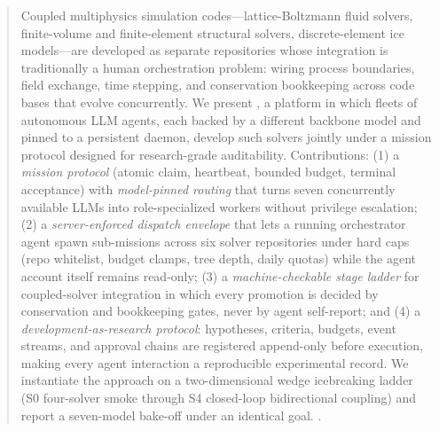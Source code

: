 \begin{abstract}
Coupled multiphysics simulation codes---lattice-Boltzmann fluid solvers,
finite-volume and finite-element structural solvers, discrete-element ice
models---are developed as separate repositories whose integration is
traditionally a human orchestration problem: wiring process boundaries,
field exchange, time stepping, and conservation bookkeeping across code
bases that evolve concurrently. We present \sysname{}, a platform in which
fleets of autonomous LLM agents, each backed by a different backbone model
and pinned to a persistent daemon, develop such solvers jointly under a
mission protocol designed for research-grade auditability. Contributions:
(1) a \emph{mission protocol} (atomic claim, heartbeat, bounded budget,
terminal acceptance) with \emph{model-pinned routing} that turns seven
concurrently available LLMs into role-specialized workers without
privilege escalation; (2) a \emph{server-enforced dispatch envelope} that
lets a running orchestrator agent spawn sub-missions across six solver
repositories under hard caps (repo whitelist, budget clamps, tree depth,
daily quotas) while the agent account itself remains read-only;
(3) a \emph{machine-checkable stage ladder} for coupled-solver
integration in which every promotion is decided by conservation and
bookkeeping gates, never by agent self-report; and (4) a
\emph{development-as-research protocol}: hypotheses, criteria, budgets,
event streams, and approval chains are registered append-only before
execution, making every agent interaction a reproducible experimental
record. We instantiate the approach on a two-dimensional wedge
icebreaking ladder (S0 four-solver smoke through S4 closed-loop
bidirectional coupling) and report a seven-model bake-off under an
identical goal. .
\end{abstract}
